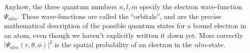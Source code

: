     \indent Anyhow, the three quantum numbers $n,l,m$ specify the electron wave-function $\Psi_{nlm}$. These wave-functions are called the ``orbitals'', and are the precise mathematical description of the possible quantum states for a bound electron in an atom, even though we haven't explicitly written it down yet. More correctly $|\Psi_{nlm}(r,\theta,\phi)|^2$ is the spatial probability of an electron in the $nlm$-state. 

